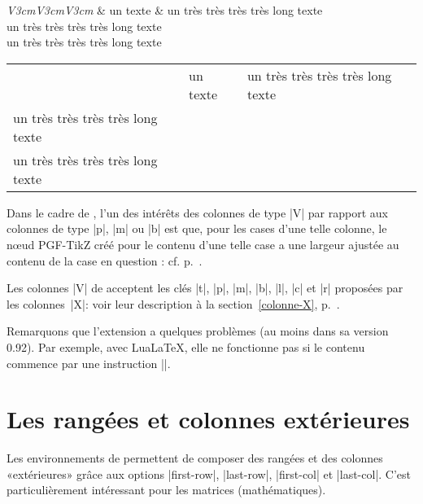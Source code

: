 \documentclass[dvipsnames]{article}%
\begin{document}
\medskip
\begin{Code}
\begin{NiceTabular}[corners=NW,hvlines]{\emph{V{3cm}V{3cm}V{3cm}}}
& un texte & un très très très très long texte \\
un très très très très long texte \\
un très très très très long texte 
\end{NiceTabular}
\end{Code}

\medskip
\begin{center}
\begin{NiceTabular}[corners=NW,hvlines]{V{3cm}V{3cm}V{3cm}}
& un texte & un très très très très long texte \\
un très très très très long texte \\
un très très très très long texte 
\end{NiceTabular}
\end{center}


Dans le cadre de
, l'un des intérêts des colonnes de type |V| par rapport aux
colonnes de type |p|, |m| ou |b| est que, pour les cases d'une telle colonne,
le nœud PGF-TikZ créé pour le contenu d'une telle case a une largeur ajustée
au contenu de la case en question : cf. p.~\pageref{node-V}. 


\medskip
Les colonnes |V| de  acceptent les clés |t|, |p|, |m|, |b|, |l|,
|c| et |r| proposées par les colonnes~|X|: voir leur description à la section~\ref{colonne-X},
p.~\pageref{colonne-X}. 

\medskip
Remarquons que l'extension  a quelques problèmes (au moins dans sa
version 0.92). Par exemple, avec LuaLaTeX, elle ne fonctionne pas si le contenu
commence par une instruction |\color|.


\medskip
\section{Les rangées et colonnes extérieures}


Les environnements de  permettent de composer des rangées et des
colonnes «extérieures» grâce aux options |first-row|, |last-row|, |first-col| et
|last-col|. C'est particulièrement intéressant pour les matrices (mathématiques).
\label{exterior}
\end{document}

